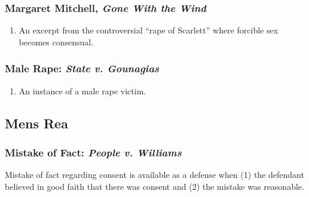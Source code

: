 \subsubsection{Margaret Mitchell, \emph{Gone With the Wind}}

\begin{enumerate}
    \item An excerpt from the controversial ``rape of Scarlett'' where 
    forcible sex becomes consensual.
\end{enumerate}

\subsubsection{Male Rape: \emph{State v. Gounagias}}

\begin{enumerate}
    \item An instance of a male rape victim.
\end{enumerate}

\subsection{Mens Rea}

\subsubsection{Mistake of Fact: \emph{People v. Williams}}

Mistake of fact regarding consent is available as a defense when (1) the 
defendant believed in good faith that there was consent and (2) the mistake 
was reasonable.

